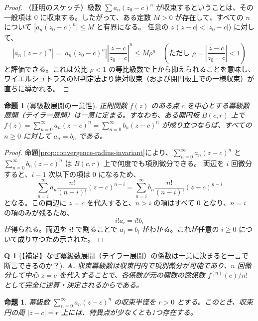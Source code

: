 \documentclass[paper=a4, fontsize=11pt]{jlreq} %
\theoremstyle{break}
\newtheorem{proposition}[theorem]{命題}
\theoremstyle{qa}
\newtheorem*{Q}{Q}
\theoremstyle{remark} %
\begin{document}
\begin{proof}%
    （証明のスケッチ）級数 $\sum a_n (z_0-c)^n$ が収束するということは、その一般項は $0$ に収束する。したがって、ある定数 $M > 0$ が存在して、すべての $n$ について $|a_n (z_0-c)^n| \le M$ と有界になる。
    任意の $z$ ($|z-c| < |z_0-c|$) に対して、
    \[
    |a_n (z-c)^n| = |a_n (z_0-c)^n| \left| \frac{z-c}{z_0-c} \right|^n \le M \rho^n \quad \left( \text{ただし } \rho = \left| \frac{z-c}{z_0-c} \right| < 1 \right)
    \]
    と評価できる。これは公比 $\rho < 1$ の等比級数で上から抑えられることを意味し、ワイエルシュトラスのM判定法より絶対収束（および閉円板上での一様収束）が直ちに導かれる。
\end{proof}
\begin{proposition}[冪級数展開の一意性]\label{prop:uniqueness_of_power_series}
    正則関数 $f(z)$ のある点 $c$ を中心とする冪級数展開（テイラー展開）は一意に定まる。すなわち、ある開円板 $B(c, r)$ 上で $f(z) = \sum_{n=0}^{\infty} a_n (z-c)^n = \sum_{n=0}^{\infty} b_n (z-c)^n$ が成り立つならば、すべての $n \ge 0$ に対して $a_n = b_n$ である。
\end{proposition}

\begin{proof}
    命題\ref{prop:convergence-radius-invariant}により、$\sum_{n=0}^{\infty} a_n (z-c)^n$ と $\sum_{n=0}^{\infty} b_n (z-c)^n$ は $B(c, r)$ 上で何度でも項別微分できる。
    両辺を $i$ 回微分すると、$i-1$ 次以下の項は $0$ になるため、
    $$
    \sum_{n=i}^{\infty} a_n\frac{n!}{(n-i)!} (z-c)^{n-i} = \sum_{n=i}^{\infty} b_n\frac{n!}{(n-i)!} (z-c)^{n-i}
    $$
    となる。この両辺に $z=c$ を代入すると、$n > i$ の項はすべて $0$ となり、$n=i$ の項のみが残るため、
    $$
    i! a_i = i! b_i
    $$
    が得られる。両辺を $i!$ で割ることで $a_i = b_i$ がわかる。これが任意の $i \ge 0$ について成り立つため示された。
\end{proof}

\begin{Q}[【補足】なぜ冪級数展開（テイラー展開）の係数は一意に決まると一言で断言できるのか？]
\textbf{A.} 収束冪級数は収束円内で項別微分が可能であり、$n$ 回微分して中心 $z=c$ を代入することで、各係数が元の関数の微係数 $f^{(n)}(c)/n!$ として完全に逆算・決定されるからである。
\end{Q}
\begin{proposition}\label{prop:singular_point_on_convergence_circle}
    冪級数 $\sum_{n=0}^{\infty}a_{n}(z-c)^{n}$ の収束半径を $r>0$ とする。このとき、収束円の周 $|z-c|=r$ 上には、特異点が少なくとも1つ存在する。
\end{proposition}
\end{document}

